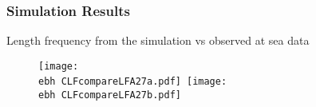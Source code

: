 \documentclass{beamer}
\newcommand{\ebh}{\string~/bio.data/bio.lobster/figures/LFA2733Framework2018/} %
\begin{document}



\begin{frame}
\frametitle{Simulation Results}
Length frequency from the simulation vs observed at sea data
\begin{figure}
        \begin{center}
               \texttt{[image: \\ebh CLFcompareLFA27a.pdf]}\
               \texttt{[image: \\ebh CLFcompareLFA27b.pdf]}\\
        \end{center}
    \end{figure}
\end{frame}
\end{document}
